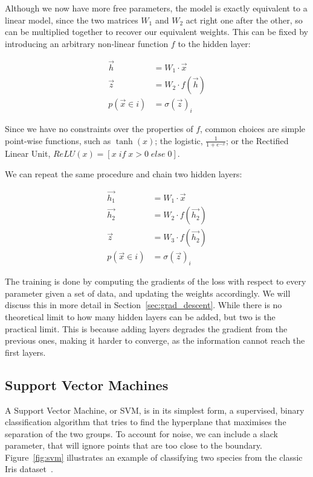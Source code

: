 Although we now have more free parameters, the model is exactly equivalent to a linear model, since the two matrices $W_1$ and $W_2$ act right one after the other, so can be multiplied together to recover our equivalent weights.
This can be fixed by introducing an arbitrary non-linear function $f$ to the hidden layer:

\begin{align*}
\vec{h} &= W_1 \cdot \vec{x} \\
\vec{z} &= W_2 \cdot f(\vec{h}) \\
p(\vec x \in i) &= \sigma(\vec z)_i
\end{align*}

Since we have no constraints over the properties of $f$, common choices are simple point-wise functions, such as $\tanh(x)$; the logistic, $\frac{1}{1 + e^{-x}}$; or the Rectified Linear Unit, $ReLU(x)=[x \; if \; x > 0 \; else \; 0]$.

We can repeat the same procedure  and chain two hidden layers:

\begin{align*}
\vec{h_1} &= W_1 \cdot \vec{x} \\
\vec{h_2} &= W_2 \cdot f(\vec{h_2}) \\
\vec{z} &= W_3 \cdot f(\vec{h_2}) \\
p(\vec x \in i) &= \sigma(\vec z)_i
\end{align*}

The training is done by computing the gradients of the loss with respect to every parameter given a set of data, and updating the weights accordingly.
We will discuss this in more detail in Section~\ref{sec:grad_descent}.
While there is no theoretical limit to how many hidden layers can be added, but two is the practical limit.
This is because adding layers degrades the gradient from the previous ones, making it harder to converge, as the information cannot reach the first layers.


\subsection{Support Vector Machines}
A Support Vector Machine, or SVM, is in its simplest form, a supervised, binary classification algorithm that tries to find the hyperplane that maximises the separation of the two groups.
To account for noise, we can include a slack parameter, that will ignore points that are too close to the boundary.
Figure~\ref{fig:svm} illustrates an example of classifying two species from the classic Iris dataset~\citep{iris_dataset}.


